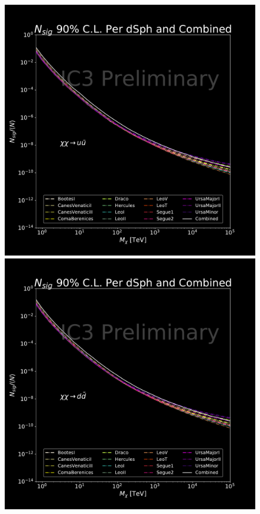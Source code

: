 \begin{figure}[h!]
{        \includegraphics[scale=0.24]{figures/ic_DM/dm_plots/uu_money_plot_comb_ns.pdf}
        \includegraphics[scale=0.24]{figures/ic_DM/dm_plots/dd_money_plot_comb_ns.pdf}
}
\end{figure}
